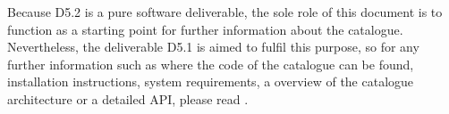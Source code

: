 \documentclass{fast_latex}
\begin{document}
Because D5.2 is a pure software deliverable, the sole role of this document is to function as a starting point for further information about the catalogue. Nevertheless, the deliverable D5.1 is aimed to fulfil this purpose, so for any further information such as where the code of the catalogue can be found, installation instructions, system requirements, a overview of the catalogue architecture or a detailed API, please read \cite{palaguita2011_usermanual}.



\clearpage


\end{document}
